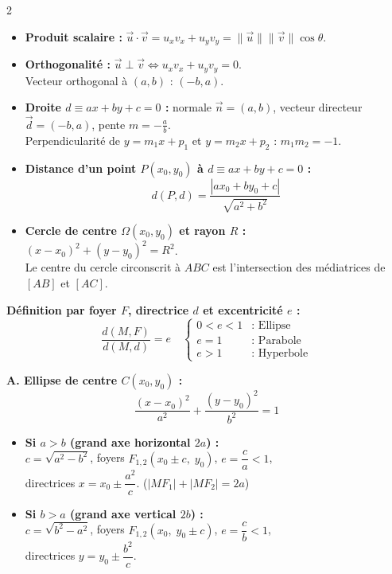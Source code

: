 {\begin{multicols}{2}
\vspace{3pt}
\begin{itemize}[leftmargin=1.2em, itemsep=1.5pt, topsep=2pt]
    \item \textbf{Produit scalaire :} $\vec{u}\cdot\vec{v} = u_x v_x + u_y v_y = \|\vec{u}\|\|\vec{v}\|\cos\theta$.
    \item \textbf{Orthogonalité :} $\vec{u} \perp \vec{v} \iff u_x v_x + u_y v_y = 0$.\\
    Vecteur orthogonal à $(a,b)$ : $(-b, a)$.
    \item \textbf{Droite $d \equiv ax + by + c = 0$ :} normale $\vec{n} = (a,b)$, vecteur directeur $\vec{d} = (-b,a)$, pente $m = -\frac{a}{b}$.\\
    Perpendicularité de $y = m_1 x + p_1$ et $y = m_2 x + p_2$ : $m_1 m_2 = -1$.
    \item \textbf{Distance d'un point $P(x_0,y_0)$ à $d \equiv ax+by+c=0$ :}
    \[
        d(P, d) = \frac{|ax_0 + by_0 + c|}{\sqrt{a^2 + b^2}}
    \]
    \item \textbf{Cercle de centre $\Omega(x_0,y_0)$ et rayon $R$ :}\\
    $(x - x_0)^2 + (y - y_0)^2 = R^2$.\\
    Le centre du cercle circonscrit à $ABC$ est l'intersection des médiatrices de $[AB]$ et $[AC]$.
\end{itemize}

\columnbreak


\vspace{2pt}
\noindent\textbf{Définition par foyer $F$, directrice $d$ et excentricité $e$ :}
\[
    \frac{d(M, F)}{d(M, d)} = e \quad \begin{cases} 0 < e < 1 & \text{: Ellipse} \\ e = 1 & \text{: Parabole} \\ e > 1 & \text{: Hyperbole} \end{cases}
\]

\vspace{2pt}
\noindent\textbf{A. Ellipse de centre $C(x_0, y_0)$ :}
\[
    \frac{(x-x_0)^2}{a^2} + \frac{(y-y_0)^2}{b^2} = 1
\]
\begin{itemize}[leftmargin=1.2em, itemsep=1.5pt, topsep=2pt]
    \item \textbf{Si $a > b$ (grand axe horizontal $2a$) :}\\
    $c = \sqrt{a^2 - b^2}$, \; foyers $F_{1,2}(x_0 \pm c,\; y_0)$, \; $e = \dfrac{c}{a} < 1$,\\
    directrices $x = x_0 \pm \dfrac{a^2}{c}$. \quad ($|MF_1| + |MF_2| = 2a$)
    \item \textbf{Si $b > a$ (grand axe vertical $2b$) :}\\
    $c = \sqrt{b^2 - a^2}$, \; foyers $F_{1,2}(x_0,\; y_0 \pm c)$, \; $e = \dfrac{c}{b} < 1$,\\
    directrices $y = y_0 \pm \dfrac{b^2}{c}$.
\end{itemize}


\end{multicols}}
